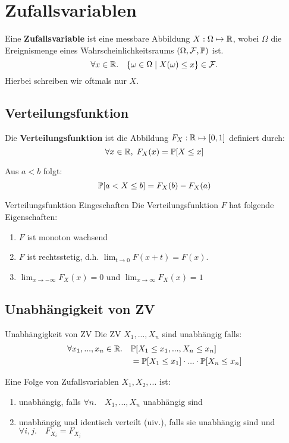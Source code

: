 \section{Zufallsvariablen}

Eine \textbf{Zufallsvariable} ist eine messbare Abbildung $X : \Omega \mapsto \mathbb{R}$, wobei $\Omega$ die Ereignismenge eines Wahrscheinlichkeitsraums $(\Omega, \mathcal{F}, \mathbb{P})$ ist.
$$\forall x \in \mathbb{R}. \quad \{\omega \in \Omega \; | \; X(\omega) \leq x\} \in \mathcal{F}.$$
Hierbei schreiben wir oftmals nur $X$.


\subsection{Verteilungsfunktion}

Die \textbf{Verteilungsfunktion} ist die Abbildung $F_X:\mathbb{R} \mapsto [0,1]$ definiert durch:
$$\forall x \in \mathbb{R}, \; F_X(x) = \mathbb{P}[X \leq x]$$

\begin{mainbox}{} Aus $a < b$ folgt:
$$\mathbb{P}[a < X \leq b] = F_X(b) - F_X(a)$$ \end{mainbox}

\begin{subbox}{Verteilungsfunktion Eingeschaften}
Die Verteilungsfunktion $F$ hat folgende Eigenschaften:
\begin{enumerate}
    \item $F$ ist monoton wachsend
    \item $F$ ist rechtsstetig, d.h. $\lim_{t \to 0} F(x + t) = F(x)$.
    \item $\lim_{x \to - \infty}F_X(x) = 0$ und $\lim_{x \to \infty}F_X(x) = 1$
\end{enumerate}
\end{subbox}

\subsection{Unabhängigkeit von ZV}

\begin{mainbox}{Unabhängigkeit von ZV}
Die ZV $X_1,...,X_n$ sind unabhängig falls:
\begin{align*}
    \forall x_1,...,x_n \in \mathbb{R}. \quad &\mathbb{P}[X_1 \leq x_1, ..., X_n \leq x_n] \\ &= \mathbb{P}[X_1 \leq x_1] \cdot ... \cdot \mathbb{P}[X_n \leq x_n]
\end{align*}
\end{mainbox}

Eine Folge von Zufallsvariablen $X_1, X_2, ...$ ist:
\begin{enumerate}
    \item unabhängig, falls $\forall n. \quad  X_1,...,X_n$ unabhängig sind
    \item unabhängig und identisch verteilt (uiv.), falls sie unabhängig sind und $\forall i,j. \quad F_{X_i} = F_{X_j}$
\end{enumerate}


